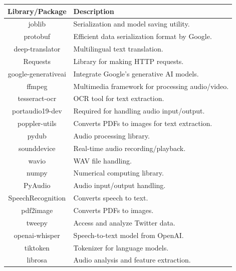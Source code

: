 \pagebreak
\begin{table}[H]
    \centering
    \renewcommand{\arraystretch}{1.2}
    \begin{tabular}{|c|p{12cm}|}
        \hline
        \rowcolor{lightestgray}
        \textbf{Library/Package} & \textbf{Description} \\
        \hline
        joblib & Serialization and model saving utility. \\
        \hline
        protobuf & Efficient data serialization format by Google. \\
        \hline
        deep-translator & Multilingual text translation. \\
        \hline
        Requests & Library for making HTTP requests. \\
        \hline
        google-generativeai & Integrate Google’s generative AI models. \\
        \hline
        ffmpeg & Multimedia framework for processing audio/video. \\
        \hline
        tesseract-ocr & OCR tool for text extraction. \\
        \hline
        portaudio19-dev & Required for handling audio input/output. \\
        \hline
        poppler-utils & Converts PDFs to images for text extraction. \\
        \hline
        pydub & Audio processing library. \\
        \hline
        sounddevice & Real-time audio recording/playback. \\
        \hline
        wavio & WAV file handling. \\
        \hline
        numpy & Numerical computing library. \\
        \hline
        PyAudio & Audio input/output handling. \\
        \hline
        SpeechRecognition & Converts speech to text. \\
        \hline
        pdf2image & Converts PDFs to images. \\
        \hline
        tweepy & Access and analyze Twitter data. \\
        \hline
        openai-whisper & Speech-to-text model from OpenAI. \\
        \hline
        tiktoken & Tokenizer for language models. \\
        \hline
        librosa & Audio analysis and feature extraction. \\

\end{tabular}
\end{table}
